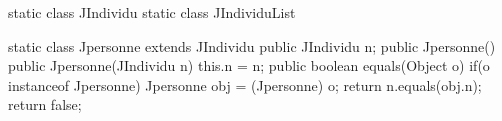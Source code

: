 static class JIndividu { }
static class JIndividuList { }


static class Jpersonne extends JIndividu {
  public JIndividu n;
  public Jpersonne() { }
  public Jpersonne(JIndividu n) { this.n = n; }
  public boolean equals(Object o) {
    if(o instanceof Jpersonne) {
      Jpersonne obj = (Jpersonne) o;
      return n.equals(obj.n);
    }
    return false;
  }
} 
